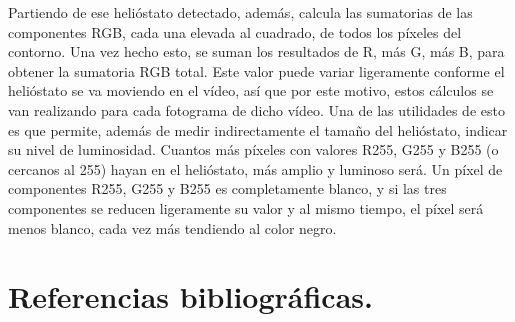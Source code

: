 \documentclass[12pt]{article}
\begin{document}
Partiendo de ese helióstato detectado, además, calcula las sumatorias de las componentes RGB, cada una elevada al cuadrado, de todos los píxeles del contorno. Una vez hecho esto, se suman los resultados de R, más G, más B, para obtener la sumatoria RGB total. Este valor puede variar ligeramente conforme el helióstato se va moviendo en el vídeo, así que por este motivo, estos cálculos se van realizando para cada fotograma de dicho vídeo. Una de las utilidades de esto es que permite, además de medir indirectamente el tamaño del helióstato, indicar su nivel de luminosidad. Cuantos más píxeles con valores R255, G255 y B255 (o cercanos al 255) hayan en el helióstato, más amplio y luminoso será. Un píxel de componentes R255, G255 y B255 es completamente blanco, y si las tres componentes se reducen ligeramente su valor y al mismo tiempo, el píxel será menos blanco, cada vez más tendiendo al color negro.
 




\section{Referencias bibliográficas.}


\end{document}
